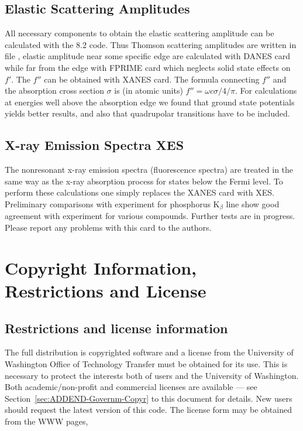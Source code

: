 \documentclass[11pt,oneside]{report} %
\begin{document}
\section{Elastic Scattering Amplitudes}
\label{sec:DANES}

All necessary components to obtain  the elastic scattering amplitude
can be calculated with the {\feff}8.2 code. Thus Thomson scattering
amplitudes are written in file , elastic amplitude
near some specific edge are calculated with DANES card while far from
the edge with FPRIME card which neglects solid state effects on $f'$.
The $f''$ can be obtained with XANES card. The formula connecting
$f''$ and the absorption cross section $\sigma $ is (in atomic units)
$f'' = \omega c \sigma /4/\pi $.   For calculations at energies
well above the absorption edge we found that ground state potentials
yields better results, and also that quadrupolar transitions 
have to be included.

\section{X-ray Emission Spectra XES}
\label{sec:XES}

The nonresonant x-ray emission spectra (fluorescence spectra) 
are treated in the same way as the x-ray absorption process
for states below the Fermi level. To perform these calculations one simply
replaces the XANES card with XES.  Preliminary comparisons with experiment
for phosphorus K$_{\beta}$ line show good agreement with experiment for various
compounds.  Further tests are in progress. Please report any problems with
this card to the authors.

\appendix

\chapter{Copyright Information,  Restrictions and License}
\label{sec:Append-A.-Copyr}

\section{Restrictions and license information}
\label{sec:Restr-License-Inform}

The full {\feff} distribution is copyrighted software and a
license from the University of
Washington Office of Technology Transfer must be obtained for its use.
This is necessary to protect the interests both of users and the
University of Washington.  Both academic/non-profit and commercial
licenses are available --- see Section~\ref{sec:ADDEND-Governm-Copyr}
to this document for details.  New users should request the latest
version of this code.  The license form may be
obtained from the {\feff} WWW pages,
\end{document}
